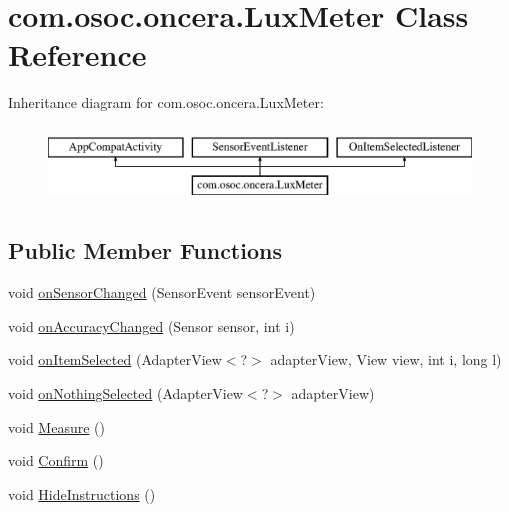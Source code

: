 \hypertarget{classcom_1_1osoc_1_1oncera_1_1_lux_meter}{}\section{com.\+osoc.\+oncera.\+Lux\+Meter Class Reference}
\label{classcom_1_1osoc_1_1oncera_1_1_lux_meter}
Inheritance diagram for com.\+osoc.\+oncera.\+Lux\+Meter\+:\begin{figure}[H]
\begin{center}
\leavevmode
\includegraphics[height=2.000000cm]{classcom_1_1osoc_1_1oncera_1_1_lux_meter}
\end{center}
\end{figure}
\subsection*{Public Member Functions}
\begin{DoxyCompactItemize}
\item 
void \mbox{\hyperlink{classcom_1_1osoc_1_1oncera_1_1_lux_meter_aff48623612061b570410ee97e14a7664}{on\+Sensor\+Changed}} (Sensor\+Event sensor\+Event)
\item 
void \mbox{\hyperlink{classcom_1_1osoc_1_1oncera_1_1_lux_meter_ae966bff7c1ad0c42e975596582103cf5}{on\+Accuracy\+Changed}} (Sensor sensor, int i)
\item 
void \mbox{\hyperlink{classcom_1_1osoc_1_1oncera_1_1_lux_meter_aeba7eb0c74354876c8df7a03e7ede8a4}{on\+Item\+Selected}} (Adapter\+View$<$?$>$ adapter\+View, View view, int i, long l)
\item 
void \mbox{\hyperlink{classcom_1_1osoc_1_1oncera_1_1_lux_meter_afd145bd9d12862d9dcdacba78a59b943}{on\+Nothing\+Selected}} (Adapter\+View$<$?$>$ adapter\+View)
\item 
void \mbox{\hyperlink{classcom_1_1osoc_1_1oncera_1_1_lux_meter_aa62bb970de63f2e2dc33ce51b81f4cd1}{Measure}} ()
\item 
void \mbox{\hyperlink{classcom_1_1osoc_1_1oncera_1_1_lux_meter_ab838cd3f14db334069325c11836b6df6}{Confirm}} ()
\item 
void \mbox{\hyperlink{classcom_1_1osoc_1_1oncera_1_1_lux_meter_a2faafc9b2da286b7c0aa3be82959073a}{Hide\+Instructions}} ()
\end{DoxyCompactItemize}
